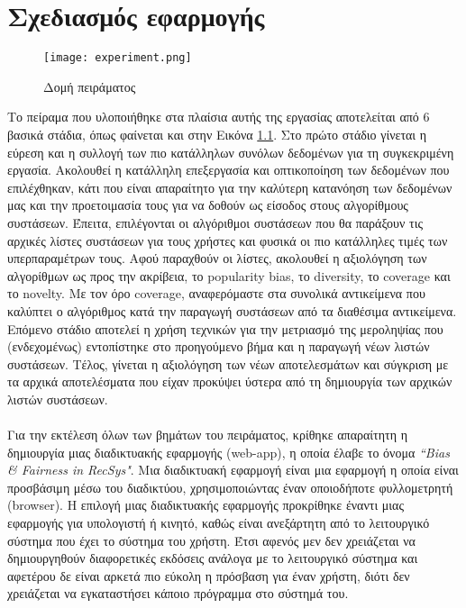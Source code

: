 \chapter{Σχεδιασμός εφαρμογής}
\label{chap3}
\begin{figure}[!htb]
	\centering
	\texttt{[image: experiment.png]}
	\caption{Δομή πειράματος}
	\label{fig:exp}
\end{figure}
\noindent Το πείραμα που υλοποιήθηκε στα πλαίσια αυτής της εργασίας αποτελείται από 6 βασικά στάδια, όπως φαίνεται και στην Εικόνα \ref{fig:exp}. Στο πρώτο στάδιο γίνεται η εύρεση και η συλλογή των πιο κατάλληλων συνόλων δεδομένων για τη συγκεκριμένη εργασία. Ακολουθεί η κατάλληλη επεξεργασία και οπτικοποίηση των δεδομένων που επιλέχθηκαν, κάτι που είναι απαραίτητο για την καλύτερη κατανόηση των δεδομένων μας και την προετοιμασία τους για να δοθούν ως είσοδος στους αλγορίθμους συστάσεων. Έπειτα, επιλέγονται οι αλγόριθμοι συστάσεων που θα παράξουν τις αρχικές λίστες συστάσεων για τους χρήστες και φυσικά οι πιο κατάλληλες τιμές των υπερπαραμέτρων τους. Αφού παραχθούν οι λίστες, ακολουθεί η αξιολόγηση των αλγορίθμων ως προς την ακρίβεια, το popularity bias, το diversity, το coverage και το novelty. Με τον όρο coverage, αναφερόμαστε στα συνολικά αντικείμενα που καλύπτει ο αλγόριθμος κατά την παραγωγή συστάσεων από τα διαθέσιμα αντικείμενα. Επόμενο στάδιο αποτελεί η χρήση τεχνικών για την μετριασμό της μεροληψίας που (ενδεχομένως) εντοπίστηκε στο προηγούμενο βήμα και η παραγωγή νέων λιστών συστάσεων. Τέλος, γίνεται η αξιολόγηση των νέων αποτελεσμάτων και σύγκριση με τα αρχικά αποτελέσματα που είχαν προκύψει ύστερα από τη δημιουργία των αρχικών λιστών συστάσεων.\\\\
Για την εκτέλεση όλων των βημάτων του πειράματος, κρίθηκε απαραίτητη η δημιουργία μιας διαδικτυακής εφαρμογής (web-app), η οποία έλαβε το όνομα \textit{``Bias \& Fairness in RecSys"}. Μια διαδικτυακή εφαρμογή είναι μια εφαρμογή η οποία είναι προσβάσιμη μέσω του διαδικτύου, χρησιμοποιώντας έναν οποιοδήποτε φυλλομετρητή (browser). Η επιλογή μιας διαδικτυακής εφαρμογής προκρίθηκε έναντι μιας εφαρμογής για υπολογιστή ή κινητό, καθώς είναι ανεξάρτητη από το λειτουργικό σύστημα που έχει το σύστημα του χρήστη. Έτσι αφενός μεν δεν χρειάζεται να δημιουργηθούν διαφορετικές εκδόσεις ανάλογα με το λειτουργικό σύστημα και αφετέρου δε είναι αρκετά πιο εύκολη η πρόσβαση για έναν χρήστη, διότι δεν χρειάζεται να εγκαταστήσει κάποιο πρόγραμμα στο σύστημά του.\\\\
